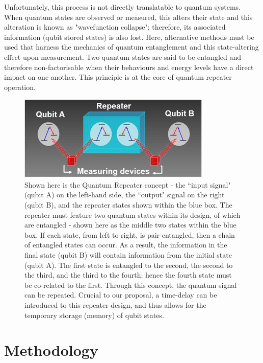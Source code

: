 \documentclass{epsrc}
\begin{document}
Unfortunately, this process is not directly translatable to quantum systems. When quantum states are observed or measured, this alters their state and this alteration is known as "wavefunction collapse"; therefore, its associated information (qubit stored states) is also lost. Here, alternative methods must be used that harness the mechanics of quantum entanglement and this state-altering effect upon measurement. Two quantum states are said to be entangled and therefore non-factorisable  when their behaviours and energy levels have a direct impact on one another. This principle is at the core of quantum repeater operation.

\begin{figure}[!htbp]
	\begin{center}
		\includegraphics[width=9.2cm]{img/Memory.jpg}
		\vspace{-16pt}
		\caption{Shown here is the Quantum Repeater concept - the ``input signal" (qubit A) on the left-hand side, the ``output" signal on the right (qubit B), and the repeater states shown within the blue box. The repeater must feature two quantum states within its design, of which are entangled - shown here as the middle two states within the blue box. If each state, from left to right, is pair-entangled, then a chain of entangled states can occur. As a result, the information in the final state (qubit B) will contain information from the initial state (qubit A). The first state is entangled to the second, the second to the third, and the third to the fourth; hence the fourth state must be co-related to the first. Through this concept, the quantum signal can be repeated. Crucial to our proposal, a time-delay can be introduced to this repeater design, and thus allows for the temporary storage (memory) of qubit states.}
		\label{fig:half}
	\end{center}
\end{figure} 

\vspace{14pt}

\section{Methodology}
\end{document}
